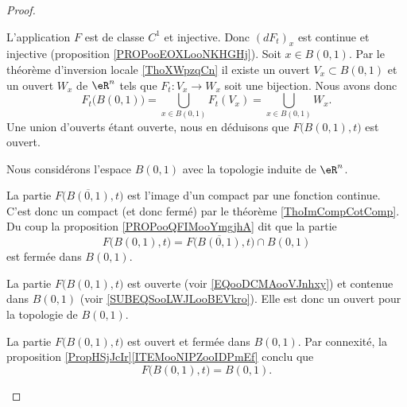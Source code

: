 \begin{proof}
\begin{subproof}

		L'application \( F\) est de classe \( C^1\) et injective. Donc \( (dF_t)_x\) est continue et injective (proposition \ref{PROPooEOXLooNKHGHj}). Soit \( x\in B(0,1)\). Par le théorème d'inversion locale \ref{ThoXWpzqCn} il existe un ouvert \( V_x\subset B(0,1)\) et un ouvert \( W_x\) de \( \eR^n\) tels que \(F_t \colon V_x\to W_x  \) soit une bijection. Nous avons donc
		\begin{equation}		\label{EQooDCMAooVJnhxy}
			F_t\big( B(0,1) \big)=\bigcup_{x\in B(0,1)}F_t(V_x)=\bigcup_{x\in B(0,1)}W_x.
		\end{equation}
		Une union d'ouverts étant ouverte, nous en déduisons que \( F\big( B(0,1),t \big)\) est ouvert.

		Nous considérons l'espace \( B(0,1)\) avec la topologie induite de \( \eR^n\).
		\begin{subproof}

			La partie \( F\big( \overline{B(0,1)},t \big)\) est l'image d'un compact par une fonction continue. C'est donc un compact (et donc fermé) par le théorème \ref{ThoImCompCotComp}. Du coup la proposition \ref{PROPooQFIMooYmgjhA} dit que la partie
			\begin{equation}
				F\big( B(0,1), t \big)=  F\big( \overline{B(0,1)}, t \big)\cap B(0,1)
			\end{equation}
			est fermée dans \( B(0,1)\).


			La partie \( F\big( B(0,1), t \big)\) est ouverte (voir \eqref{EQooDCMAooVJnhxy}) et contenue dans \( B(0,1)\) (voir \eqref{SUBEQSooLWJLooBEVkro}). Elle est donc un ouvert pour la topologie de \( B(0,1)\).


			La partie \( F\big( B(0,1), t \big)\) est ouvert et fermée dans \( B(0,1)\). Par connexité, la proposition \ref{PropHSjJcIr}\ref{ITEMooNIPZooIDPmEf} conclu que
			\begin{equation}
				F\big( B(0,1),t \big)=B(0,1).
			\end{equation}
		\end{subproof}


\end{subproof}
\end{proof}
